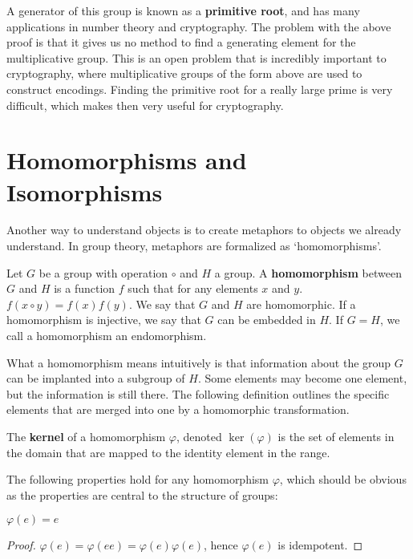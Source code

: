 A generator of this group is known as a {\bf primitive root}, and has many applications in number theory and cryptography. The problem with the above proof is that it gives us no method to find a generating element for the multiplicative group. This is an open problem that is incredibly important to cryptography, where multiplicative groups of the form above are used to construct encodings. Finding the primitive root for a really large prime is very difficult, which makes then very useful for cryptography.


\chapter{Homomorphisms and Isomorphisms}

Another way to understand objects is to create metaphors to objects we already understand. In group theory, metaphors are formalized as `homomorphisms'.

\begin{definition}
Let $G$ be a group with operation $\circ$ and $H$ a group. A {\bf homomorphism}  between $G$ and $H$ is a function $f$ such that for any elements $x$ and $y$. $f(x \circ y) = f(x) f(y)$. We say that $G$ and $H$ are homomorphic. If a homomorphism is injective, we say that $G$ can be embedded in $H$. If $G = H$, we call a homomorphism an endomorphism.
\end{definition}

What a homomorphism means intuitively is that information about the group $G$ can be implanted into a subgroup of $H$. Some elements may become one element, but the information is still there. The following definition outlines the specific elements that are merged into one by a homomorphic transformation.

\begin{definition}
    The {\bf kernel}  of a homomorphism $\varphi$, denoted $\ker(\varphi)$ is the set of elements in the domain that are mapped to the identity element in the range.
\end{definition}

The following properties hold for any homomorphism $\varphi$, which should be obvious as the properties are central to the structure of groups:

\begin{lemma} $\varphi(e) = e$ \end{lemma}
\begin{proof} $\varphi(e) = \varphi(ee) = \varphi(e)\varphi(e)$, hence $\varphi(e)$ is idempotent. \end{proof}

